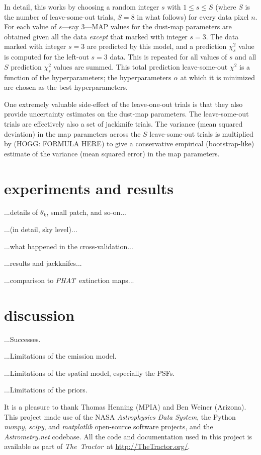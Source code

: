 \documentclass[12pt,pdftex,preprint]{aastex}
\newcommand{\project}[1]{\textsl{#1}}
\newcommand{\TheTractor}{\project{The~Tractor}}
\newcommand{\PHAT}{\project{PHAT}}
\begin{document}
In detail, this works by choosing a random integer $s$ with $1\leq
s\leq S$ (where $S$ is the number of leave-some-out trials, $S=8$ in
what follows) for every data pixel $n$.  For each value of $s$---say
3---MAP values for the dust-map parameters are obtained given all the
data \emph{except} that marked with integer $s=3$.  The data marked
with integer $s=3$ are predicted by this model, and a prediction
$\chi_s^2$ value is computed for the left-out $s=3$ data.  This is
repeated for all values of $s$ and all $S$ prediction $\chi_s^2$
values are summed.  This total prediction leave-some-out $\chi^2$ is a
function of the hyperparameters; the hyperparameters $\alpha$ at which
it is minimized are chosen as the best hyperparameters.

One extremely valuable side-effect of the leave-one-out trials is that
they also provide uncertainty estimates on the dust-map parameters.
The leave-some-out trials are effectively also a set of jackknife
trials.  The variance (mean squared deviation) in the map parameters
across the $S$ leave-some-out trials is multiplied by (HOGG: FORMULA
HERE) to give a conservative empirical (bootstrap-like) estimate of
the variance (mean squared error) in the map parameters.

\section{experiments and results}

...details of $\theta_k$, small patch, and so-on...

...(in detail, sky level)...

...what happened in the cross-validation...

...results and jackknifes...

...comparison to \PHAT\ extinction maps...

\section{discussion}

...Successes.

...Limitations of the emission model.

...Limitations of the spatial model, especially the PSFs.

...Limitations of the priors.

\acknowledgements It is a pleasure to thank Thomas Henning (MPIA) and
Ben Weiner (Arizona).  This project made use of the NASA
\project{Astrophysics Data System}, the Python \project{numpy},
\project{scipy}, and \project{matplotlib} open-source software
projects, and the \project{Astrometry.net} codebase.  All the code and
documentation used in this project is available as part of
\TheTractor\ at \url{http://TheTractor.org/}.
\end{document}
